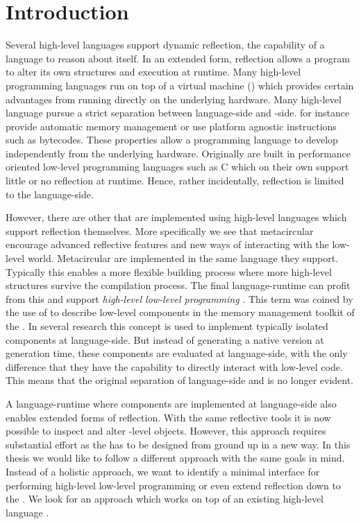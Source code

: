 
\chapter{Introduction}
\minitoc

\noindent Several high-level languages support dynamic reflection, the capability of a language to reason about itself.
In an extended form, reflection allows a program to alter its own structures and execution at runtime.
Many high-level programming languages run on top of a virtual machine (\VM) which provides certain advantages from running directly on the underlying hardware.
Many high-level language \VMs pursue a strict separation between language-side and \VM-side.
\VMs for instance provide automatic memory management or use platform agnostic instructions such as bytecodes.
These properties allow a programming language to develop independently from the underlying hardware.
Originally \VMs are built in performance oriented low-level programming languages such as C which on their own support little or no reflection at runtime.
Hence, rather incidentally, reflection is limited to the language-side.

However, there are other \VMs that are implemented using high-level languages which support reflection themselves.
More specifically we see that metacircular \VMs encourage advanced reflective features and new ways of interacting with the low-level \VM world.
Metacircular \VMs are implemented in the same language they support.
Typically this enables a more flexible building process where more high-level structures survive the compilation process.
The final language-runtime can profit from this and support \emph{high-level low-level programming} \cite{Fram09a}.
This term was coined by the use of \Java to describe low-level components in the memory management toolkit of the \Jikes \VM.
In several research \VMs this concept is used to implement typically isolated \VM components at language-side.
But instead of generating a native version at \VM generation time, these components are evaluated at language-side, with the only difference that they have the capability to directly interact with low-level code.
This means that the original separation of language-side and \VM is no longer evident.

A language-runtime where \VM components are implemented at language-side also enables extended forms of reflection.
With the same reflective tools it is now possible to inspect and alter \VM-level objects.
However, this approach requires substantial effort as the \VM has to be designed from ground up in a new way.
In this thesis we would like to follow a different approach with the same goals in mind.
Instead of a holistic approach, we want to identify a minimal interface for performing high-level low-level programming or even extend reflection down to the \VM.
We look for an approach which works on top of an existing high-level language \VM.

